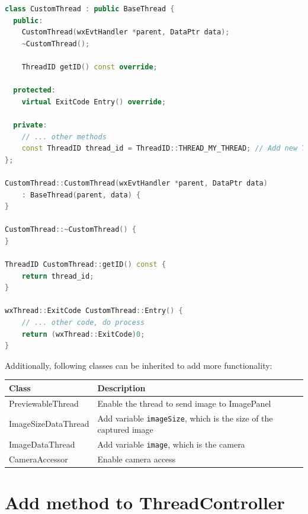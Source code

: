 \begin{lstlisting}[language=C++, caption={CustomThread class example}]
class CustomThread : public BaseThread {
  public:
    CustomThread(wxEvtHandler *parent, DataPtr data);
    ~CustomThread();

    ThreadID getID() const override;

  protected:
    virtual ExitCode Entry() override;

  private:
    // ... other methods
    const ThreadID thread_id = ThreadID::THREAD_MY_THREAD; // Add new ThreadID enum here
};

CustomThread::CustomThread(wxEvtHandler *parent, DataPtr data)
    : BaseThread(parent, data) {
}

CustomThread::~CustomThread() {
}

ThreadID CustomThread::getID() const {
    return thread_id;
}

wxThread::ExitCode CustomThread::Entry() {
    // ... other code, do process
    return (wxThread::ExitCode)0;
}
\end{lstlisting}

Additionally, following classes can be inherited to add more functionality:

\begin{table}[h]
      \centering
      \begin{tabular}{|l|p{10cm}|}
            \hline
            Class               & Description                                                              \\
            \hline
            PreviewableThread   & Enable the thread to send image to ImagePanel                            \\
            ImageSizeDataThread & Add variable \texttt{imageSize}, which is the size of the captured image \\
            ImageDataThread     & Add variable \texttt{image}, which is the camera                         \\
            CameraAccessor      & Enable camera access                                                     \\
            \hline
      \end{tabular}
\end{table}

\section{Add method to ThreadController}

